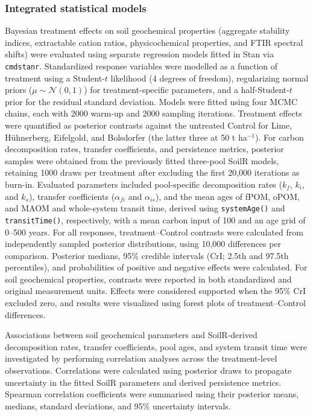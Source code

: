 \documentclass[preprint,12pt]{elsarticle}
\begin{document}
\subsubsection{Integrated statistical models}
Bayesian treatment effects on soil geochemical properties (aggregate stability indices, extractable cation ratios, physicochemical properties, and FTIR spectral shifts) were evaluated using separate regression models fitted in Stan via \texttt{cmdstanr}. Standardized response variables were modelled as a function of treatment using a Student-$t$ likelihood (4 degrees of freedom), regularizing normal priors ($\mu \sim \mathcal{N}(0,1)$) for treatment-specific parameters, and a half-Student-$t$ prior for the residual standard deviation. Models were fitted using four MCMC chains, each with 2000 warm-up and 2000 sampling iterations. Treatment effects were quantified as posterior contrasts against the untreated Control for Lime, Hühnerberg, Eifelgold, and Bolsdorfer (the latter three at 50 t ha$^{-1}$). For carbon decomposition rates, transfer coefficients, and persistence metrics, posterior samples were obtained from the previously fitted three-pool SoilR models, retaining 1000 draws per treatment after excluding the first 20,000 iterations as burn-in. Evaluated parameters included pool-specific decomposition rates ($k_f$, $k_i$, and $k_s$), transfer coefficients ($\alpha_{fi}$ and $\alpha_{is}$), and the mean ages of fPOM, oPOM, and MAOM and whole-system transit time, derived using \texttt{systemAge()} and \texttt{transitTime()}, respectively, with a mean carbon input of 100 and an age grid of 0--500 years. For all responses, treatment--Control contrasts were calculated from independently sampled posterior distributions, using 10,000 differences per comparison. Posterior medians, 95\% credible intervals (CrI; 2.5th and 97.5th percentiles), and probabilities of positive and negative effects were calculated. For soil geochemical properties, contrasts were reported in both standardized and original measurement units. Effects were considered supported when the 95\% CrI excluded zero, and results were visualized using forest plots of treatment--Control differences.

Associations between soil geochemical parameters and SoilR-derived decomposition rates, transfer coefficients, pool ages, and system transit time were investigated by performing correlation analyses across the treatment-level observations. Correlations were calculated using posterior draws to propagate uncertainty in the fitted SoilR parameters and derived persistence metrics. Spearman correlation coefficients were summarised using their posterior means, medians, standard deviations, and 95\% uncertainty intervals. 
\end{document}
